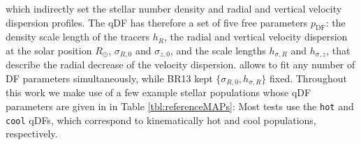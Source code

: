 which indirectly set the stellar number density and radial and vertical velocity dispersion profiles. The qDF has therefore a set of five free parameters $p_\text{DF}$: the density scale length of the tracers $h_R$, the radial and vertical velocity dispersion at the solar position $R_\odot$, $\sigma_{R,0}$ and $\sigma_{z,0}$, and the scale lengths $h_{\sigma,R}$ and $h_{\sigma,z}$, that describe the radial decrease of the velocity dispersion. \RM{} allows to fit any number of DF parameters simultaneously, while BR13 kept $\{\sigma_{R,0},h_{\sigma,R}\}$ fixed. Throughout this work we make use of a few example stellar populations whose qDF parameters are given in in Table \ref{tbl:referenceMAPs}: Most tests use the \texttt{hot} and \texttt{cool} qDFs, which correspond to kinematically hot and cool populations, respectively.\\

